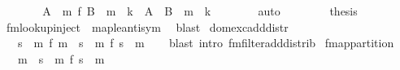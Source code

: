 \begin{isabellebody}
\ \ \ \ \isamarkupfalse%
\ \isamarkupfalse%
\ {\isachardoublequoteopen}{\isacharparenleft}{\kern0pt}A\ {\isasymlhd}\ m\ {\isacharplus}{\kern0pt}{\isacharplus}{\kern0pt}\isactrlsub f\ B\ {\isasymlhd}\ m{\isacharparenright}{\kern0pt}\ {\isachardollar}{\kern0pt}{\isachardollar}{\kern0pt}\ k\ {\isacharequal}{\kern0pt}\ {\isacharparenleft}{\kern0pt}{\isacharparenleft}{\kern0pt}A\ {\isasymunion}\ B{\isacharparenright}{\kern0pt}\ {\isasymlhd}\ m{\isacharparenright}{\kern0pt}\ {\isachardollar}{\kern0pt}{\isachardollar}{\kern0pt}\ k{\isachardoublequoteclose}\isanewline
\ \ \ \ \ \ \isamarkupfalse%
\ auto\isanewline
\ \ \isamarkupfalse%
\isanewline
\ \ \isamarkupfalse%
\ \isamarkupfalse%
\ {\isacharquery}{\kern0pt}thesis\isanewline
\ \ \ \ \isamarkupfalse%
\ fmlookup{\isacharunderscore}{\kern0pt}inject\ \ map{\isacharunderscore}{\kern0pt}le{\isacharunderscore}{\kern0pt}antisym\ \isamarkupfalse%
\ blast\isanewline
{}\isamarkupfalse%
%
\endisatagproof
{\isafoldproof}%
%
\isadelimproof
\isanewline
%
\endisadelimproof
\isanewline
{}\isamarkupfalse%
\ dom{\isacharunderscore}{\kern0pt}exc{\isacharunderscore}{\kern0pt}add{\isacharunderscore}{\kern0pt}distr{\isacharcolon}{\kern0pt}\isanewline
\ \ \ {\isachardoublequoteopen}s\ {\isasymlhd}{\isacharslash}{\kern0pt}\ {\isacharparenleft}{\kern0pt}m\ {\isacharplus}{\kern0pt}{\isacharplus}{\kern0pt}\isactrlsub f\ m\ {\isacharequal}{\kern0pt}\ {\isacharparenleft}{\kern0pt}s\ {\isasymlhd}{\isacharslash}{\kern0pt}\ m\ {\isacharplus}{\kern0pt}{\isacharplus}{\kern0pt}\isactrlsub f\ {\isacharparenleft}{\kern0pt}s\ {\isasymlhd}{\isacharslash}{\kern0pt}\ m\isanewline
%
\isadelimproof
\ \ %
\endisadelimproof
%
\isatagproof
{}\isamarkupfalse%
\ {\isacharparenleft}{\kern0pt}blast\ intro{\isacharcolon}{\kern0pt}\ fmfilter{\isacharunderscore}{\kern0pt}add{\isacharunderscore}{\kern0pt}distrib{\isacharparenright}{\kern0pt}%
\endisatagproof
{\isafoldproof}%
%
\isadelimproof
\isanewline
%
\endisadelimproof
\isanewline
{}\isamarkupfalse%
\ fmap{\isacharunderscore}{\kern0pt}partition{\isacharcolon}{\kern0pt}\isanewline
\ \ \ {\isachardoublequoteopen}m\ {\isacharequal}{\kern0pt}\ s\ {\isasymlhd}{\isacharslash}{\kern0pt}\ m\ {\isacharplus}{\kern0pt}{\isacharplus}{\kern0pt}\isactrlsub f\ s\ {\isasymlhd}\ m{\isachardoublequoteclose}\isanewline

\end{isabellebody}
